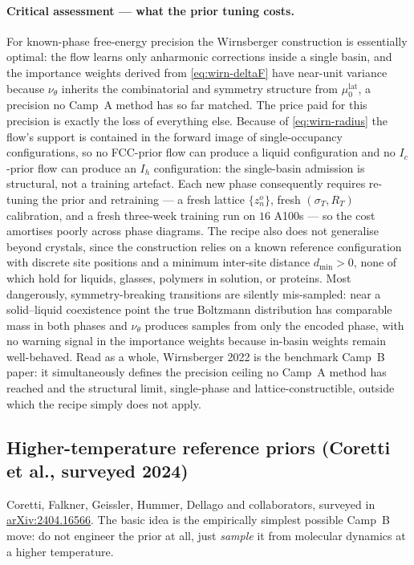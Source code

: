 \documentclass[11pt,letterpaper]{article}
\theoremstyle{plain}
\begin{document}
\paragraph{Critical assessment --- what the prior tuning costs.} For
known-phase free-energy precision the Wirnsberger construction is essentially
optimal: the flow learns only anharmonic corrections inside a single basin,
and the importance weights derived from \eqref{eq:wirn-deltaF} have near-unit
variance because $\nu_\theta$ inherits the combinatorial and symmetry
structure from $\mu_0^{\mathrm{lat}}$, a precision no Camp~A method has so
far matched. The price paid for this precision is exactly the loss of
everything else. Because of \eqref{eq:wirn-radius} the flow's support is
contained in the forward image of single-occupancy configurations, so no
FCC-prior flow can produce a liquid configuration and no $I_c$-prior flow
can produce an $I_h$ configuration: the single-basin admission is structural,
not a training artefact. Each new phase consequently requires re-tuning the
prior and retraining --- a fresh lattice $\{z^o_n\}$, fresh $(\sigma_T,R_T)$
calibration, and a fresh three-week training run on $16$ A100s --- so the
cost amortises poorly across phase diagrams. The recipe also does not
generalise beyond crystals, since the construction relies on a known
reference configuration with discrete site positions and a minimum
inter-site distance $d_{\min}>0$, none of which hold for liquids, glasses,
polymers in solution, or proteins. Most dangerously, symmetry-breaking
transitions are silently mis-sampled: near a solid--liquid coexistence point
the true Boltzmann distribution has comparable mass in both phases and
$\nu_\theta$ produces samples from only the encoded phase, with no warning
signal in the importance weights because in-basin weights remain well-behaved.
Read as a whole, Wirnsberger 2022 is the benchmark Camp~B paper: it
simultaneously defines the precision ceiling no Camp~A method has reached
and the structural limit, single-phase and lattice-constructible, outside
which the recipe simply does not apply.

\subsection{Higher-temperature reference priors (Coretti et al., surveyed 2024)}
\label{sec:coretti}

Coretti, Falkner, Geissler, Hummer, Dellago and collaborators, surveyed in
\href{https://arxiv.org/html/2404.16566v1}{arXiv:2404.16566}. The basic
idea is the empirically simplest possible Camp~B move: do not engineer the
prior at all, just \emph{sample} it from molecular dynamics at a higher
temperature.
\end{document}
